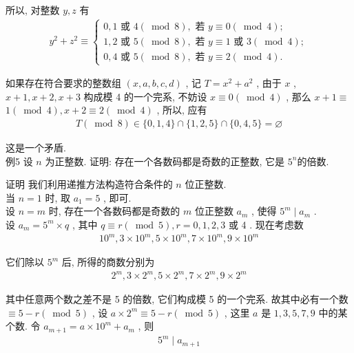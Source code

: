 	所以, 对整数 $y ,  z$ 有
	\begin{align*}
		y^{2}+z^{2} \equiv\left\{\begin{array}{l}
			                         0,1 \text { 或 } 4(\bmod 8), \text { 若 } y \equiv 0(\bmod 4) ;                  \\
			                         1,2 \text { 或 } 5(\bmod 8) ,  \text { 若 } y \equiv 1 \text { 或 } 3(\bmod 4) ; \\
			                         0,4 \text { 或 } 5(\bmod 8) ,  \text { 若 } y \equiv 2(\bmod 4) .
		                         \end{array}\right.
	\end{align*}

	如果存在符合要求的整数组 $(x, a, b, c, d)$ , 记 $T=x^{2}+a^{2}$ , 由于 $x$ ,  $x+1, x+2, x+3$ 构成模 4 的一个完系, 不妨设 $x \equiv 0(\bmod 4)$ , 那么 $x+1 \equiv$ $1(\bmod 4), x+2 \equiv 2(\bmod 4)$ , 所以, 应有
	\begin{align*}
		T(\bmod 8) \in\{0,1,4\} \cap\{1,2,5\} \cap\{0,4,5\}=\varnothing
	\end{align*}

	这是一个矛盾. \\
	例5 设 $n$ 为正整数. 证明: 存在一个各数码都是奇数的正整数, 它是 $5^{n}$的倍数.

	证明 我们利用递推方法构造符合条件的 $n$ 位正整数. \\
	当 $n=1$ 时, 取 $a_{1}=5$ , 即可. \\
	设 $n=m$ 时, 存在一个各数码都是奇数的 $m$ 位正整数 $a_{m}$ , 使得 $5^{m} \mid a_{m}$ . \\
	设 $a_{m}=5^{m} \times q$ , 其中 $q \equiv r(\bmod 5), r=0,1,2,3$ 或 4 . 现在考虑数
	\begin{align*}
		10^{m}, 3 \times 10^{m}, 5 \times 10^{m}, 7 \times 10^{m}, 9 \times 10^{m}
	\end{align*}

	它们除以 $5^{m}$ 后, 所得的商数分别为
	\begin{align*}
		2^{m}, 3 \times 2^{m}, 5 \times 2^{m}, 7 \times 2^{m}, 9 \times 2^{m}
	\end{align*}

	其中任意两个数之差不是 5 的倍数, 它们构成模 5 的一个完系. 故其中必有一个数 $\equiv 5-r(\bmod 5)$ , 设 $a \times 2^{m} \equiv 5-r(\bmod 5)$ , 这里 $a$ 是 $1 ,  3 ,  5 ,  7 ,  9$ 中的某个数. 令 $a_{m+1}=a \times 10^{m}+a_{m}$ , 则
	\begin{align*}
		5^{m} \mid a_{m+1}
	\end{align*}


